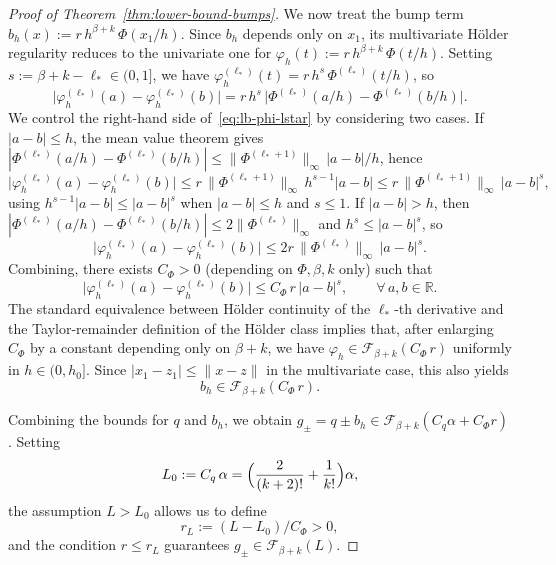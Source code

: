 \documentclass{article}
\renewcommand{\leq}{\leqslant}
\theoremstyle{definition}
\begin{document}
\begin{proof}[Proof of Theorem~\ref{thm:lower-bound-bumps}]
We now treat the bump term 
$b_h(x):=r\,h^{\beta+k}\,\Phi(x_1/h)$. Since $b_h$ depends only 
on $x_1$, its multivariate H\"older regularity reduces to the 
univariate one for 
$\varphi_h(t):=r\,h^{\beta+k}\,\Phi(t/h)$. Setting 
$s:=\beta+k-\ell_*\in(0,1]$, we have 
$\varphi_h^{(\ell_*)}(t)=r\,h^s\,\Phi^{(\ell_*)}(t/h)$, so
\begin{equation}
\label{eq:lb-phi-lstar}
\bigl|\varphi_h^{(\ell_*)}(a)-\varphi_h^{(\ell_*)}(b)\bigr|
=r\,h^s\,\bigl|\Phi^{(\ell_*)}(a/h)-\Phi^{(\ell_*)}(b/h)\bigr|.
\end{equation}
We control the right-hand side of~\eqref{eq:lb-phi-lstar} 
by considering two cases. If $|a-b|\leq h$, the mean value 
theorem gives 
$|\Phi^{(\ell_*)}(a/h)-\Phi^{(\ell_*)}(b/h)|\leq 
\|\Phi^{(\ell_*+1)}\|_\infty\,|a-b|/h$, hence
\[
\bigl|\varphi_h^{(\ell_*)}(a)-\varphi_h^{(\ell_*)}(b)\bigr|
\leq r\,\|\Phi^{(\ell_*+1)}\|_\infty\,h^{s-1}|a-b|
\leq r\,\|\Phi^{(\ell_*+1)}\|_\infty\,|a-b|^s,
\]
using $h^{s-1}|a-b|\leq |a-b|^s$ when $|a-b|\leq h$ and 
$s\leq 1$. If $|a-b|>h$, then 
$|\Phi^{(\ell_*)}(a/h)-\Phi^{(\ell_*)}(b/h)|
\leq 2\|\Phi^{(\ell_*)}\|_\infty$ and $h^s\leq |a-b|^s$, so
\[
\bigl|\varphi_h^{(\ell_*)}(a)-\varphi_h^{(\ell_*)}(b)\bigr|
\leq 2r\,\|\Phi^{(\ell_*)}\|_\infty\,|a-b|^s.
\]
Combining, there exists $C_\Phi>0$ (depending on $\Phi,\beta,k$ 
only) such that
\begin{equation}
\label{eq:lb-phi-holder-univar}
\bigl|\varphi_h^{(\ell_*)}(a)-\varphi_h^{(\ell_*)}(b)\bigr|
\leq C_\Phi\,r\,|a-b|^s,\qquad\forall\,a,b\in\mathbb{R}.
\end{equation}
The standard equivalence between H\"older continuity of the 
$\ell_*$-th derivative and the Taylor-remainder definition of the 
H\"older class %
implies that, after enlarging $C_\Phi$ by a constant depending 
only on $\beta+k$, we have 
$\varphi_h\in\mathcal{F}_{\beta+k}(C_\Phi\,r)$ uniformly in 
$h\in(0,h_0]$. Since $|x_1-z_1|\leq\|x-z\|$ in the multivariate 
case, this also yields
\begin{equation}
\label{eq:lb-bh-holder}
b_h\in\mathcal{F}_{\beta+k}(C_\Phi\,r).
\end{equation}

Combining the bounds for $q$ and $b_h$, we obtain 
$g_\pm=q\pm b_h\in\mathcal{F}_{\beta+k}(C_q\alpha+C_\Phi r)$. 
Setting 
\begin{equation}
\label{eq:lb-L0}
L_0:=C_q\,\alpha=\Bigl(\frac{2}{(k+2)!}+\frac{1}{k!}\Bigr)\alpha,
\end{equation}
the assumption $L>L_0$ allows us to define 
\begin{equation}
\label{eq:lb-rL}
r_L:=(L-L_0)/C_\Phi>0,
\end{equation}
and the condition $r\leq r_L$ guarantees 
$g_\pm\in\mathcal{F}_{\beta+k}(L)$.


\end{proof}
\end{document}
